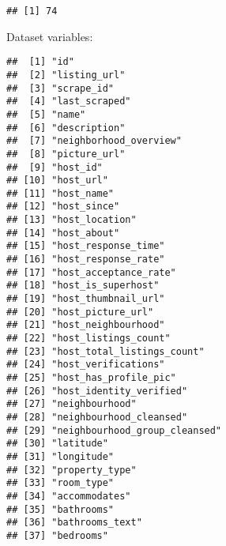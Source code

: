 \begin{verbatim}
## [1] 74
\end{verbatim}

Dataset variables:

\begin{Shaded}
\begin{Highlighting}[]
\end{Highlighting}
\end{Shaded}

\begin{verbatim}
##  [1] "id"                                          
##  [2] "listing_url"                                 
##  [3] "scrape_id"                                   
##  [4] "last_scraped"                                
##  [5] "name"                                        
##  [6] "description"                                 
##  [7] "neighborhood_overview"                       
##  [8] "picture_url"                                 
##  [9] "host_id"                                     
## [10] "host_url"                                    
## [11] "host_name"                                   
## [12] "host_since"                                  
## [13] "host_location"                               
## [14] "host_about"                                  
## [15] "host_response_time"                          
## [16] "host_response_rate"                          
## [17] "host_acceptance_rate"                        
## [18] "host_is_superhost"                           
## [19] "host_thumbnail_url"                          
## [20] "host_picture_url"                            
## [21] "host_neighbourhood"                          
## [22] "host_listings_count"                         
## [23] "host_total_listings_count"                   
## [24] "host_verifications"                          
## [25] "host_has_profile_pic"                        
## [26] "host_identity_verified"                      
## [27] "neighbourhood"                               
## [28] "neighbourhood_cleansed"                      
## [29] "neighbourhood_group_cleansed"                
## [30] "latitude"                                    
## [31] "longitude"                                   
## [32] "property_type"                               
## [33] "room_type"                                   
## [34] "accommodates"                                
## [35] "bathrooms"                                   
## [36] "bathrooms_text"                              
## [37] "bedrooms"                                    

\end{verbatim}
